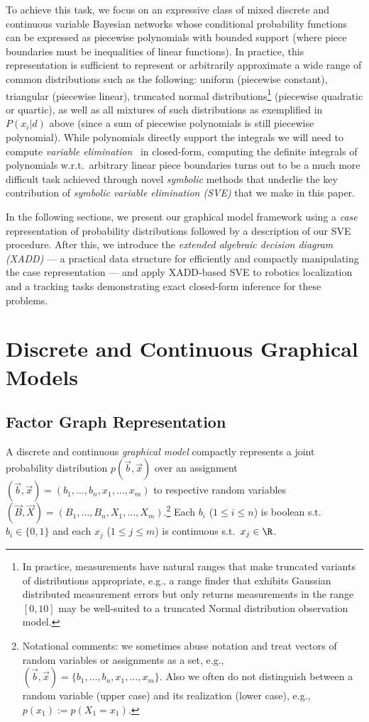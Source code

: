 \documentclass[letterpaper]{article}
\renewcommand{\-}{\text{-}}
\begin{document}
To achieve this task, we focus on an expressive class of mixed
discrete and continuous variable Bayesian networks whose conditional
probability functions can be expressed as piecewise polynomials with
bounded support (where piece boundaries must be inequalities of linear
functions).  In practice, this representation is sufficient to
represent or arbitrarily approximate a wide range of common
distributions such as the following: uniform (piecewise constant),
triangular (piecewise linear), truncated normal
distributions\footnote{In practice, measurements have natural ranges
that make truncated variants of distributions appropriate, e.g., a
range finder that exhibits Gaussian distributed measurement errors but
only returns measurements in the range $[0,10]$ may be well-suited to
a truncated Normal distribution observation model.}  (piecewise
quadratic or quartic), as well as all mixtures of such distributions
as exemplified in $P(x_i|d)$ above (since a sum of piecewise
polynomials is still piecewise polynomial).  While polynomials
directly support the integrals we will need to compute \emph{variable
elimination}~\cite{varelim} in closed-form, computing the definite
integrals of polynomials w.r.t.\ arbitrary linear piece boundaries
turns out to be a much more difficult task achieved through novel
\emph{symbolic} methods that underlie the key contribution of
\emph{symbolic variable elimination (SVE)} that we make in this paper.

In the following sections, we present our graphical model
framework using a \emph{case} representation of probability
distributions followed by a description of our SVE procedure.  
After this, we introduce
the \emph{extended algebraic decision diagram (XADD)} --- a practical
data structure for efficiently and compactly manipulating the case
representation --- and apply XADD-based SVE to robotics localization 
and a tracking tasks demonstrating exact closed-form inference 
for these problems.  

\section{Discrete and Continuous Graphical Models}

\subsection{Factor Graph Representation}

A discrete and continuous \emph{graphical model} compactly represents
a joint probability distribution $p(\vec{b},\vec{x})$ over an
assignment $(\vec{b},\vec{x}) = ( b_1,\ldots,b_n,x_{1},\ldots,x_m )$
to respective random variables $(\vec{B},\vec{X}) =
(B_1,\ldots,B_n,X_{1},\ldots,X_m )$.\footnote{Notational comments:
we sometimes abuse notation and treat
vectors of random variables or assignments as a set, e.g., 
$(\vec{b},\vec{x}) = \{ b_1,\ldots,b_n,x_1,\ldots,x_m \}$.  
Also we often do
not distinguish between a random variable (upper case) and its
realization (lower case), e.g., $p(x_1) := p(X_1 = x_1)$.}  Each $b_i$
($1 \leq i \leq n$) is boolean s.t.\ $b_i \in \{ 0,1 \}$ and each
$x_j$ ($1 \leq j \leq m$) is continuous s.t.\ $x_j \in \R$.
\end{document}
